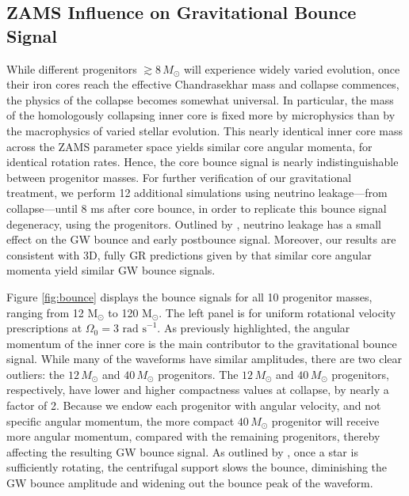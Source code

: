 \documentclass[twocolumn,times]{aastex62}  %
\newcommand{\Msun}{\ensuremath{\mathrm{M}_\odot}\xspace}
\begin{document}


\subsection{ZAMS Influence on Gravitational Bounce Signal}

While different progenitors $\gtrsim$$8\, M_\odot$ will experience widely varied evolution, once their iron cores reach the effective Chandrasekhar mass \citep{baron:1990} and collapse commences, the physics of the collapse becomes somewhat universal.
In particular, the mass of the homologously collapsing inner core is fixed more by microphysics than by the macrophysics of varied stellar evolution. 
This nearly identical inner core mass across the ZAMS parameter space yields similar core angular momenta, for identical rotation rates.  Hence, the core bounce signal is nearly indistinguishable between progenitor masses.  For further verification of our gravitational treatment, we perform 12 additional simulations using neutrino leakage---from collapse---until 8 ms after core bounce, in order to replicate this bounce signal degeneracy, using the \citet{Suk:2016} progenitors.  Outlined by \citet{ott:2012}, neutrino leakage has a small effect on the GW bounce and early postbounce signal.  
Moreover, our results are consistent with 3D, fully GR predictions given by \citet {ott:2012} that similar core angular momenta yield similar GW bounce signals.  

Figure \ref{fig:bounce} displays the bounce signals for all 10 progenitor masses, ranging from 12 \Msun to 120 \Msun.  The left panel is for uniform rotational velocity prescriptions at $\Omega_0 = 3\text{ rad s}^{-1}$.  As previously highlighted, the angular momentum of the inner core is the main contributor to the gravitational bounce signal.  While many of the waveforms have similar amplitudes, there are two clear outliers: the $12\,M_\odot$ and $40\,M_\odot$ progenitors.  The $12\,M_\odot$ and $40\,M_\odot$ progenitors, respectively, have lower and higher compactness values at collapse, by nearly a factor of 2.  Because we endow each progenitor with angular velocity, and not specific angular momentum, the more compact $40\,M_\odot$ progenitor will receive more angular momentum, compared with the remaining progenitors, thereby affecting the resulting GW bounce signal.  As outlined by \citet{dimm:2008}, once a star is sufficiently rotating, the centrifugal support slows the bounce, diminishing the GW bounce amplitude and widening out the bounce peak of the waveform.  
\end{document}
